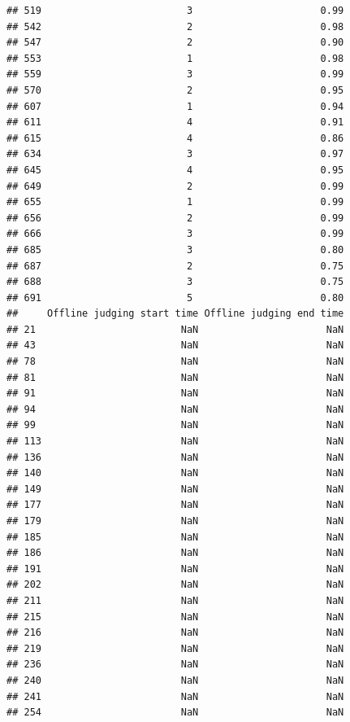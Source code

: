 \documentclass[
]{article}
\begin{document}
\begin{verbatim}
## 519                         3                      0.99
## 542                         2                      0.98
## 547                         2                      0.90
## 553                         1                      0.98
## 559                         3                      0.99
## 570                         2                      0.95
## 607                         1                      0.94
## 611                         4                      0.91
## 615                         4                      0.86
## 634                         3                      0.97
## 645                         4                      0.95
## 649                         2                      0.99
## 655                         1                      0.99
## 656                         2                      0.99
## 666                         3                      0.99
## 685                         3                      0.80
## 687                         2                      0.75
## 688                         3                      0.75
## 691                         5                      0.80
##     Offline judging start time Offline judging end time
## 21                         NaN                      NaN
## 43                         NaN                      NaN
## 78                         NaN                      NaN
## 81                         NaN                      NaN
## 91                         NaN                      NaN
## 94                         NaN                      NaN
## 99                         NaN                      NaN
## 113                        NaN                      NaN
## 136                        NaN                      NaN
## 140                        NaN                      NaN
## 149                        NaN                      NaN
## 177                        NaN                      NaN
## 179                        NaN                      NaN
## 185                        NaN                      NaN
## 186                        NaN                      NaN
## 191                        NaN                      NaN
## 202                        NaN                      NaN
## 211                        NaN                      NaN
## 215                        NaN                      NaN
## 216                        NaN                      NaN
## 219                        NaN                      NaN
## 236                        NaN                      NaN
## 240                        NaN                      NaN
## 241                        NaN                      NaN
## 254                        NaN                      NaN

\end{verbatim}
\end{document}
